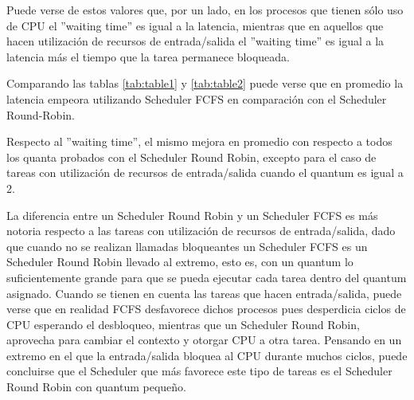 Puede verse de estos valores que, por un lado, en los procesos que tienen sólo uso de CPU el ''waiting time'' es igual a la latencia, mientras que en aquellos que hacen utilización de recursos de entrada/salida el ''waiting time'' es igual a la latencia más el tiempo que la tarea permanece bloqueada.

Comparando las tablas \ref{tab:table1} y \ref{tab:table2} puede verse que en promedio la latencia empeora utilizando Scheduler FCFS en comparación con el Scheduler Round-Robin.

Respecto al ''waiting time'', el mismo mejora en promedio con respecto a todos los quanta probados con el Scheduler Round Robin, excepto para el caso de tareas con utilización de recursos de entrada/salida cuando el quantum es igual a 2.

La diferencia entre un Scheduler Round Robin y un Scheduler FCFS es más notoria respecto a las tareas con utilización de recursos de entrada/salida, dado que cuando no se realizan llamadas bloqueantes un Scheduler FCFS es un Scheduler Round Robin llevado al extremo, esto es, con un quantum lo suficientemente grande para que se pueda ejecutar cada tarea dentro del quantum asignado. Cuando se tienen en cuenta las tareas que hacen entrada/salida, puede verse que en realidad FCFS desfavorece dichos procesos pues desperdicia ciclos de CPU esperando el desbloqueo, mientras que un Scheduler Round Robin, aprovecha para cambiar el contexto y otorgar CPU a otra tarea. Pensando en un extremo en el que la entrada/salida bloquea al CPU durante muchos ciclos, puede concluirse que el Scheduler que más favorece este tipo de tareas es el Scheduler Round Robin con quantum pequeño.